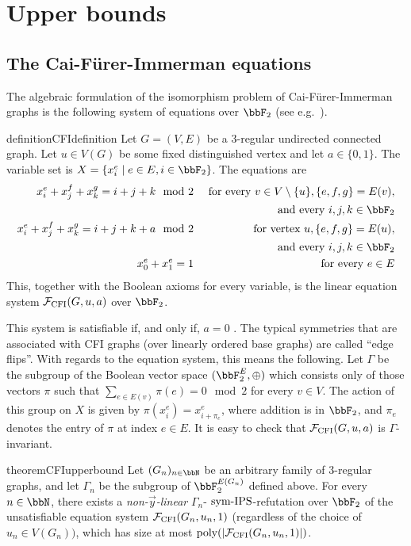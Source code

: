 \documentclass[10pt,a4paper]{article}
\newcommand{\Ff}{{\cal F}}
\newcommand{\CFI}{\Ff_{\mathrm{CFI}}}
\newcommand{\poly}{\text{\upshape poly}}
\newcommand{\symIPS}{\text{ \upshape sym-IPS}}
\begin{document}
\section{Upper bounds}

\subsection{The Cai-Fürer-Immerman equations}
\label{sec:CFI}



The algebraic formulation of the isomorphism problem of Cai-Fürer-Immerman graphs is the following system of equations over $\bbF_2$ (see e.g.\ \cite{atseriasBulatovDawar}).
\begin{restatable}{definition}{CFIdefinition}
	\label{def:CFI}
	Let $G = (V,E)$ be a 3-regular undirected connected graph. Let $u \in V(G)$ be some fixed distinguished vertex and let $a \in \{0,1\}$. 
	The variable set is $X = \{x^e_i \mid e \in E, i \in \bbF_2\}$. The equations are
	\begin{align*}
		x_i^{e} + x_j^{f}  + x_k^{g} = i+j+k \mod 2  & & \text{      for every } v \in V \setminus \{u\}, \{e,f,g\} = E(v),\\
		&  & \text{ and every } i,j,k \in \bbF_2\\
		x_i^{e} + x_j^{f}  + x_k^{g} = i+j+k+a \mod 2 & & \text{ for vertex } u, \{e,f,g\} = E(u),\\
		&  & \text{ and every } i,j,k \in \bbF_2\\
		x_0^{e} + x_1^{e} = 1 & & \text{ for every } e \in E
	\end{align*}	
	This, together with the Boolean axioms for every variable, is the linear equation system $\CFI(G, u, a)$ over $\bbF_2$.
\end{restatable}
This system is satisfiable if, and only if, $a = 0$ \cite{atseriasBulatovDawar}. 
The typical symmetries that are associated with CFI graphs (over linearly ordered base graphs) are called ``edge flips''. With regards to the equation system, this means the following. Let $\Gamma$ be the subgroup of the Boolean vector space $(\bbF_2^{E}, \oplus)$ which consists only of those vectors $\pi$ such that $\sum_{e \in E(v)} \pi(e) = 0 \mod 2$ for every $v \in V$. 
The action of this group on $X$ is given by $\pi(x^e_i) = x^e_{i+\pi_e}$, where addition is in $\bbF_2$, and $\pi_e$ denotes the entry of $\pi$ at index $e \in E$. It is easy to check that $\CFI(G, u, a)$ is $\Gamma$-invariant. 
\begin{restatable}{theorem}{CFIupperbound}
	\label{thm:symmetricF2RefutationCFI}
	Let $(G_n)_{n \in \bbN}$ be an arbitrary family of $3$-regular graphs, and let $\Gamma_n$ be the subgroup of $\bbF_2^{E(G_n)}$ defined above.
	For every $n \in \bbN$, there exists a \emph{non-$\vec{y}$-linear} $\Gamma_n$-$\symIPS$-refutation over $\bbF_2$ of the unsatisfiable equation system $\CFI(G_n, u_n, 1)$ (regardless of the choice of $u_n \in V(G_n))$, which has size at most $\poly(|\CFI(G_n, u_n, 1)|)$. 
\end{restatable}	
\end{document}

